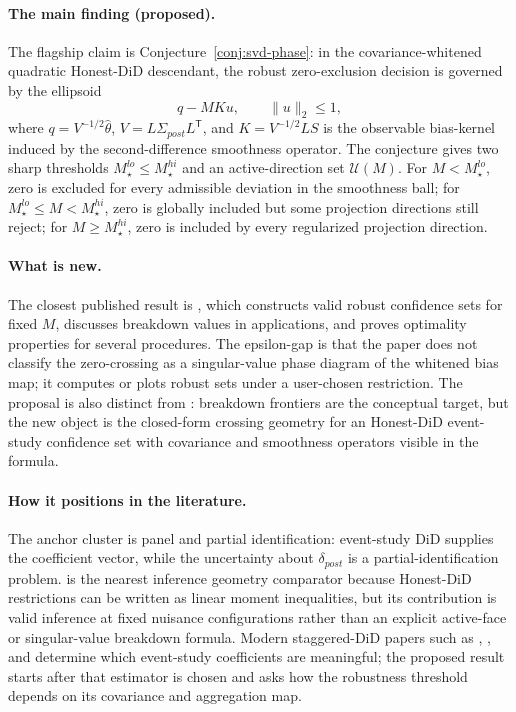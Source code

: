 \documentclass[11pt]{article}
\newcommand{\transpose}{\mathsf{T}}
\theoremstyle{definition}
\theoremstyle{plain}
\theoremstyle{remark}
\begin{document}
\paragraph{The main finding (proposed).}
The flagship claim is Conjecture~\ref{conj:svd-phase}: in the covariance-whitened quadratic Honest-DiD descendant, the robust zero-exclusion decision is governed by the ellipsoid
\[
  q - M K u,\qquad \|u\|_2\le 1,
\]
where \(q=V^{-1/2}\widehat\theta\), \(V=L\Sigma_{post}L^\transpose\), and \(K=V^{-1/2}L S\) is the observable bias-kernel induced by the second-difference smoothness operator.
The conjecture gives two sharp thresholds \(M_\star^{lo}\le M_\star^{hi}\) and an active-direction set \(\mathcal U(M)\).
For \(M<M_\star^{lo}\), zero is excluded for every admissible deviation in the smoothness ball; for \(M_\star^{lo}\le M<M_\star^{hi}\), zero is globally included but some projection directions still reject; for \(M\ge M_\star^{hi}\), zero is included by every regularized projection direction.

\paragraph{What is new.}
The closest published result is \citet{rambachan2023parallel}, which constructs valid robust confidence sets for fixed \(M\), discusses breakdown values in applications, and proves optimality properties for several procedures.
The epsilon-gap is that the paper does not classify the zero-crossing as a singular-value phase diagram of the whitened bias map; it computes or plots robust sets under a user-chosen restriction.
The proposal is also distinct from \citet{masten2020breakdown}: breakdown frontiers are the conceptual target, but the new object is the closed-form crossing geometry for an Honest-DiD event-study confidence set with covariance and smoothness operators visible in the formula.

\paragraph{How it positions in the literature.}
The anchor cluster is panel and partial identification: event-study DiD supplies the coefficient vector, while the uncertainty about \(\delta_{post}\) is a partial-identification problem.
\citet{andrews2023linear} is the nearest inference geometry comparator because Honest-DiD restrictions can be written as linear moment inequalities, but its contribution is valid inference at fixed nuisance configurations rather than an explicit active-face or singular-value breakdown formula.
Modern staggered-DiD papers such as \citet{callaway2021multiple}, \citet{sunabraham2021eventstudy}, and \citet{borusyak2024eventstudy} determine which event-study coefficients are meaningful; the proposed result starts after that estimator is chosen and asks how the robustness threshold depends on its covariance and aggregation map.
\end{document}
